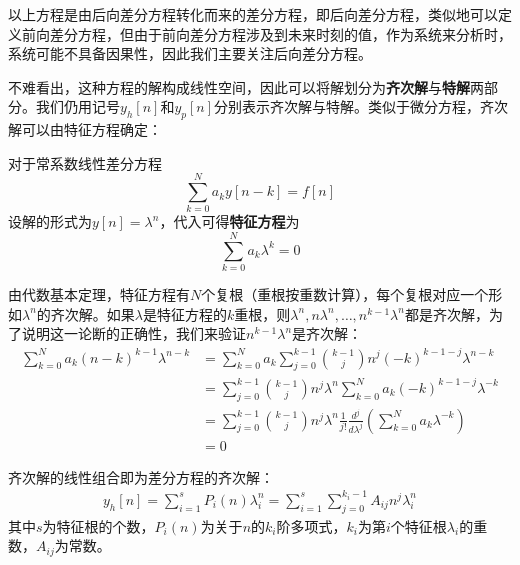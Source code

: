 \documentclass{ctexbook}
\begin{document}
以上方程是由后向差分方程转化而来的差分方程，即后向差分方程，类似地可以定义前向差分方程，但由于前向差分方程涉及到未来时刻的值，作为系统来分析时，系统可能不具备因果性，因此我们主要关注后向差分方程。

不难看出，这种方程的解构成线性空间，因此可以将解划分为\textbf{齐次解}与\textbf{特解}两部分。我们仍用记号$y_h[n]$和$y_p[n]$分别表示齐次解与特解。类似于微分方程，齐次解可以由特征方程确定：
\begin{definition}[常系数线性差分方程的特征方程]
    对于常系数线性差分方程
    $$\sum_{k=0}^{N}a_k y[n-k] = f[n]$$
    设解的形式为$y[n]=\lambda^n$，代入可得\textbf{特征方程}为
    $$\sum_{k=0}^{N}a_k \lambda^k = 0$$
\end{definition}

由代数基本定理，特征方程有$N$个复根（重根按重数计算），每个复根对应一个形如$\lambda^n$的齐次解。如果$\lambda$是特征方程的$k$重根，则$\lambda^n,n\lambda^n,\dots,n^{k-1}\lambda^n$都是齐次解，为了说明这一论断的正确性，我们来验证$n^{k-1}\lambda^n$是齐次解：\begin{align*}
    \sum_{k=0}^{N}a_k (n-k)^{k-1}\lambda^{n-k}&=\sum_{k=0}^{N}a_k \sum_{j=0}^{k-1}\binom{k-1}{j}n^j(-k)^{k-1-j}\lambda^{n-k}\\
    &=\sum_{j=0}^{k-1}\binom{k-1}{j}n^j\lambda^n\sum_{k=0}^{N}a_k (-k)^{k-1-j}\lambda^{-k}\\
    &=\sum_{j=0}^{k-1}\binom{k-1}{j}n^j\lambda^n\frac{1}{j!}\frac{d^{j}}{d\lambda^{j}}\left(\sum_{k=0}^{N}a_k \lambda^{-k}\right)\\
    &=0
\end{align*}

齐次解的线性组合即为差分方程的齐次解：\begin{align*}
    y_h[n]=\sum_{i=1}^{s}P_i(n) \lambda_i^n=\sum_{i=1}^{s}\sum_{j=0}^{k_i-1}A_{ij} n^j \lambda_i^n
\end{align*}
其中$s$为特征根的个数，$P_i(n)$为关于$n$的$k_i$阶多项式，$k_i$为第$i$个特征根$\lambda_i$的重数，$A_{ij}$为常数。
\end{document}
